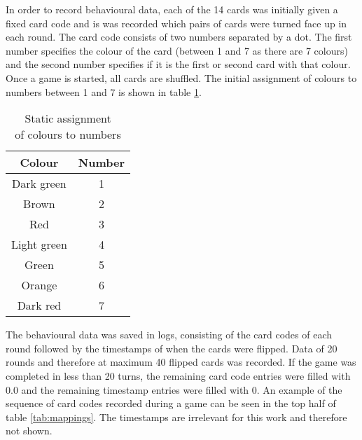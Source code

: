 \begin{minipage}[b]{0.6\textwidth}
	In order to record behavioural data, each of the 14 cards was initially given a fixed card code and is was recorded which pairs of cards were turned face up in each round. The card code consists of two numbers separated by a dot. The first number specifies the colour of the card (between 1 and 7 as there are 7 colours) and the second number specifies if it is the first or second card with that colour. Once a game is started, all cards are shuffled. The initial assignment of colours to numbers between 1 and 7 is shown in table \ref{tab:colorAssign}.
\end{minipage}
\begin{minipage}[b]{0.4\textwidth}
	
	\begin{table}[H]
		\centering
		
		\begin{tabular}{|c|c|}
			\hline
			Colour & Number  \\
			\hline
			Dark green & 1 \\
			Brown & 2 \\
			Red & 3 \\
			Light green & 4 \\
			Green & 5 \\
			Orange & 6 \\
			Dark red & 7 \\
			\hline
		\end{tabular}
		\caption[Static assignment of colours to numbers]{Static assignment\\\hspace{0\textwidth}of colours to numbers}
		\label{tab:colorAssign}
	\end{table}
\end{minipage}




The behavioural data was saved in logs, consisting of the card codes of each round followed by the timestamps of when the cards were flipped. Data of 20 rounds and therefore at maximum 40 flipped cards was recorded. If the game was completed in less than 20 turns, the remaining card code entries were filled with 0.0 and the remaining timestamp entries were filled with 0. An example of the sequence of card codes recorded during a game can be seen in the top half of table \ref{tab:mappings}. The timestamps are irrelevant for this work and therefore not shown. 

